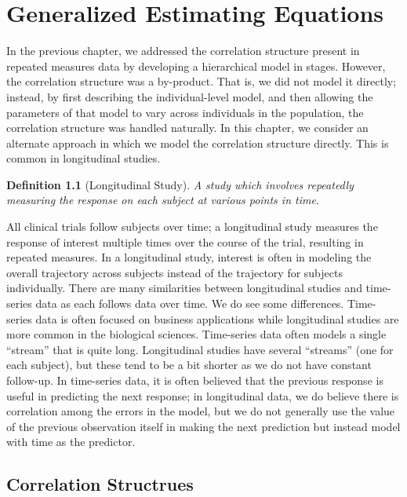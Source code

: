 \documentclass[
]{book}
\theoremstyle{plain}
\theoremstyle{mydefn}
\newtheorem{definition}{Definition}[chapter]
\theoremstyle{myexmpl}
\theoremstyle{remark}
\begin{document}
\hypertarget{rm-gee}{%
\chapter{Generalized Estimating Equations}\label{rm-gee}}

In the previous chapter, we addressed the correlation structure present in repeated measures data by developing a hierarchical model in stages. However, the correlation structure was a by-product. That is, we did not model it directly; instead, by first describing the individual-level model, and then allowing the parameters of that model to vary across individuals in the population, the correlation structure was handled naturally. In this chapter, we consider an alternate approach in which we model the correlation structure directly. This is common in longitudinal studies.

\begin{definition}[Longitudinal Study]
A study which involves repeatedly measuring the response on each subject at various points in time.
\end{definition}

All clinical trials follow subjects over time; a longitudinal study measures the response of interest multiple times over the course of the trial, resulting in repeated measures. In a longitudinal study, interest is often in modeling the overall trajectory across subjects instead of the trajectory for subjects individually. There are many similarities between longitudinal studies and time-series data as each follows data over time. We do see some differences. Time-series data is often focused on business applications while longitudinal studies are more common in the biological sciences. Time-series data often models a single ``stream'' that is quite long. Longitudinal studies have several ``streams'' (one for each subject), but these tend to be a bit shorter as we do not have constant follow-up. In time-series data, it is often believed that the previous response is useful in predicting the next response; in longitudinal data, we do believe there is correlation among the errors in the model, but we do not generally use the value of the previous observation itself in making the next prediction but instead model with time as the predictor.

\hypertarget{correlation-structrues}{%
\section{Correlation Structrues}\label{correlation-structrues}}
\end{document}
